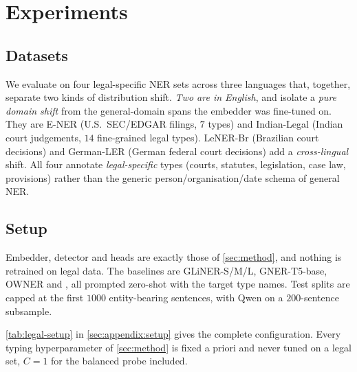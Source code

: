\section{Experiments}
\label{sec:experiments}

\subsection{Datasets}
\label{sec:exp:datasets}
We evaluate on four legal-specific NER sets across three languages that, together, separate two kinds of distribution shift. \emph{Two are in English}, and isolate a \emph{pure domain shift} from the general-domain spans the embedder was fine-tuned on. They are E-NER \citep{au2022ener} (U.S.\ SEC/EDGAR filings, $7$ types) and Indian-Legal \citep{kalamkar2022indianlegal} (Indian court judgements, $14$ fine-grained legal types). LeNER-Br \citep{luzdearaujo2018lenerbr} (Brazilian court decisions) and German-LER \citep{leitner2020germanler} (German federal court decisions) add a \emph{cross-lingual} shift. All four annotate \emph{legal-specific} types (courts, statutes, legislation, case law, provisions) rather than the generic person/organisation/date schema of general NER. 


\subsection{Setup}
\label{sec:exp:setup}
Embedder, detector and heads are exactly those of \autoref{sec:method}, and nothing is retrained on legal data. The baselines are GLiNER-S/M/L, GNER-T5-base, OWNER and , all prompted zero-shot with the target type names. Test splits are capped at the first $1000$ entity-bearing sentences, with Qwen on a $200$-sentence subsample. 

\autoref{tab:legal-setup} in \autoref{sec:appendix:setup} gives the complete configuration. Every typing hyperparameter of \autoref{sec:method} is fixed a priori and never tuned on a legal set, $C{=}1$ for the balanced probe included. 

